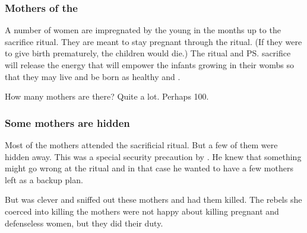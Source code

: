 




\subsubsection{Mothers of the \resphan}
A number of \nephilic{} women are impregnated by the young \Thanatzil{} in the months up to the sacrifice ritual. 
They are meant to stay pregnant through the ritual. 
(If they were to give birth prematurely, the children would die.)
The ritual and \ps{\Thanatzil} sacrifice will release the \bane{} energy that will empower the infants growing in their wombs so that they may live and be born as healthy \resphain{} and \resviel. 

How many mothers are there? 
Quite a lot. 
Perhaps 100. 





\subsubsection{Some mothers are hidden}
Most of the mothers attended the sacrificial ritual. 
But a few of them were hidden away. 
This was a special security precaution by \Daggerrain. 
He knew that something might go wrong at the ritual and in that case he wanted to have a few mothers left as a backup plan. 

But \Vexstrasshin{} was clever and sniffed out these mothers and had them killed. 
The \nephilic{} rebels she coerced into killing the mothers were not happy about killing pregnant and defenseless women, but they did their duty. 









